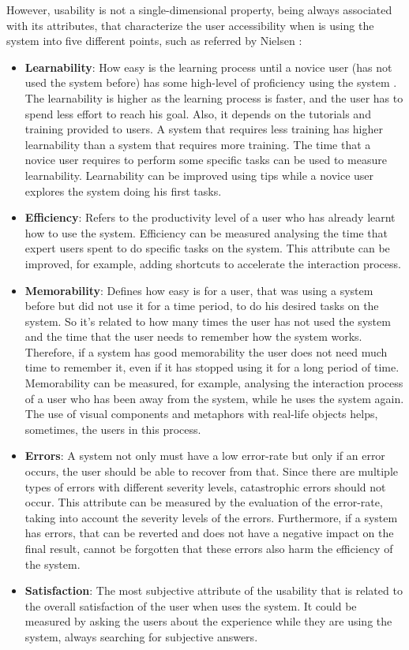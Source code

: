 However, usability is not a single-dimensional property, being always associated with its attributes, that characterize the user accessibility when is using the system into five different points, such as referred by Nielsen \cite{usabilityEngineering}:

\begin{itemize}
	\item \textbf{Learnability}: How easy is the learning process until a novice user (has not used the system before) has some high-level of proficiency using the system \cite{measuringLearnabilityInHumanComputerInteraction}. The learnability is higher as the learning process is faster, and the user has to spend less effort to reach his goal. Also, it depends on the tutorials and training provided to users. A system that requires less training has higher learnability than a system that requires more training. The time that a novice user requires to perform some specific tasks can be used to measure learnability. Learnability can be improved using tips while a novice user explores the system doing his first tasks.
	\item \textbf{Efficiency}: Refers to the productivity level of a user who has already learnt how to use the system. Efficiency can be measured analysing the time that expert users spent to do specific tasks on the system. This attribute can be improved, for example, adding shortcuts to accelerate the interaction process.
	\item \textbf{Memorability}: Defines how easy is for a user, that was using a system before but did not use it for a time period, to do his desired tasks on the system. So it’s related to how many times the user has not used the system and the time that the user needs to remember how the system works. Therefore, if a system has good memorability the user does not need much time to remember it, even if it has stopped using it for a long period of time. Memorability can be measured, for example, analysing the interaction process of a user who has been away from the system, while he uses the system again. The use of visual components and metaphors with real-life objects helps, sometimes, the users in this process.
	\item \textbf{Errors}: A system not only must have a low error-rate but only if an error occurs, the user should be able to recover from that. Since there are multiple types of errors with different severity levels, catastrophic errors should not occur. This attribute can be measured by the evaluation of the error-rate, taking into account the severity levels of the errors. Furthermore, if a system has errors, that can be reverted and does not have a negative impact on the final result, cannot be forgotten that these errors also harm the efficiency of the system.
	\item \textbf{Satisfaction}: The most subjective attribute of the usability that is related to the overall satisfaction of the user when uses the system. It could be measured by asking the users about the experience while they are using the system, always searching for subjective answers.
\end{itemize}

